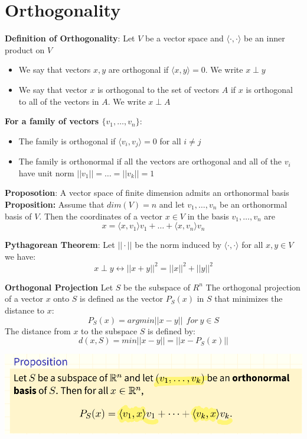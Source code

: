 \documentclass[12pt,twoside]{article}
\begin{document}
\section{Orthogonality}
\textbf{Definition of Orthogonality}:
Let $V$ be a vector space and $\langle \cdot, \cdot \rangle$ be an inner product on $V$
\begin{itemize}
    \item We say that vectors $x,y$ are orthogonal  if $\langle x,y \rangle = 0$. We write $x \perp y$
    \item We say that vector $x$ is orthogonal to the set of vectors $A$ if $x$ is orthogonal to all of the vectors in $A$. We write $x \perp A$
\end{itemize}
\textbf{For a family of vectors $\{v_1,\dots, v_n \}$}:
\begin{itemize}
    \item The family is orthogonal if $\langle v_i, v_j \rangle =0$ for all $i \neq j$
    \item The family is orthonormal if all the vectors are orthogonal and all of the $v_i$ have unit norm $||v_1|| = \dots = ||v_k|| = 1$
\end{itemize}
\textbf{Proposotion}: A vector space of finite dimension admits an orthonormal basis\\
\textbf{Proposition:} Assume that $dim(V)=n$ and let $v_1, \dots, v_n$ be an orthonormal basis of $V$. Then the coordinates of a vector $x \in V$ in the basis $v_1, \dots, v_n$ are
$$
    x = \langle x, v_1 \rangle v_1 + \dots + \langle x,v_n \rangle v_n 
$$

\textbf{Pythagorean Theorem}:
Let $||\cdot||$ be the norm induced by $\langle \cdot, \cdot \rangle $ for all $x,y \in V$ we have:
$$
    x \perp y \longleftrightarrow ||x+y||^2 = ||x||^2 + ||y||^2
$$

\textbf{Orthogonal Projection}
Let $S$ be the subspace of $R^n$ The orthogonal projection of a vector $x$ onto $S$ is defined as the vector $P_S(x)$ in $S$ that minimizes the distance to $x$:
$$
    P_S(x) = argmin ||x-y|| \ \ for \ y\in S
$$
The distance from $x$ to the subspace $S$ is defined by:
$$
    d(x,S) = min||x-y|| = ||x-P_S(x)|| 
$$

\includegraphics[scale=.45]{screenshots/computing orthogonal projection.png}\\
\end{document}
